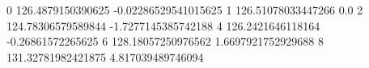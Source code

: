 0 126.4879150390625 -0.02286529541015625
1 126.51078033447266 0.0
2 124.78306579589844 -1.7277145385742188
4 126.2421646118164 -0.26861572265625
6 128.18057250976562 1.6697921752929688
8 131.32781982421875 4.817039489746094
